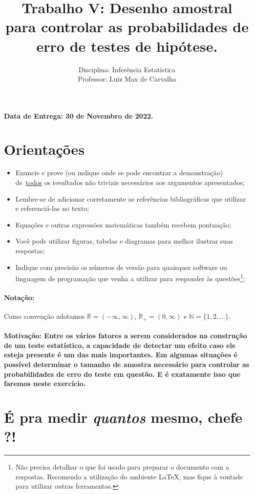 \documentclass[a4paper,10pt, notitlepage]{report}
\title{Trabalho V: Desenho amostral para controlar as probabilidades de erro de testes de hipótese.}
\author{Disciplina: Inferência Estatística \\ Professor: Luiz Max de Carvalho}
\newcommand{\rpl}{\mathbb{R}_+}
\begin{document}
\maketitle

\textbf{Data de Entrega: 30 de Novembro de 2022.}

\section*{Orientações}
\begin{itemize}
 \item Enuncie e prove (ou indique onde se pode encontrar a demonstração) de~\underline{todos} os resultados não triviais necessários aos argumentos apresentados;
 \item Lembre-se de adicionar corretamente as referências bibliográficas que utilizar e referenciá-las no texto;
 \item Equações e outras expressões matemáticas também recebem pontuação;
 \item Você pode utilizar figuras, tabelas e diagramas para melhor ilustrar suas respostas;
 \item Indique com precisão os números de versão para quaisquer software ou linguagem de programação que venha a utilizar para responder às questões\footnote{Não precisa detalhar o que foi usado para preparar o documento com a respostas. Recomendo a utilização do ambiente LaTeX, mas fique à vontade para utilizar outras ferramentas.};
 \end{itemize}


\paragraph{Notação:} Como convenção adotamos $\mathbb{R} = (-\infty, \infty)$, $\rpl = (0, \infty)$ e $\mathbb{N} = \{1, 2, \ldots \}$.

\paragraph{Motivação: Entre os vários fatores a serem considerados na construção de um teste estatístico, a capacidade de detectar um efeito caso ele esteja presente é um das mais importantes.
Em algumas situações é possível determinar o tamanho de amostra necessário para controlar as probabilidades de erro do teste em questão.
E é exatamente isso que faremos neste exercício.
}

\section*{É pra medir \textit{quantos} mesmo, chefe ?!}
\end{document}
